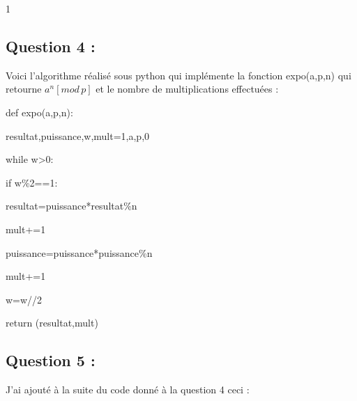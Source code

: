 1\documentclass[a4paper, 11pt,french]{article}
\begin{document}
\subsection*{Question 4 :}

Voici l'algorithme réalisé sous python qui implémente la fonction expo(a,p,n) qui retourne $a^n  [mod \, p]$ et le nombre de multiplications effectuées :

\begin{center}
\begin{minipage}{0.5\linewidth}
\newcommand\esp{\hspace{1cm}}

  def expo(a,p,n):
  
  \esp    resultat,puissance,w,mult=1,a,p,0
  
  \esp    while w>0:
  
  \esp\esp        if w\%2==1:
  
  \esp\esp\esp            resultat=puissance*resultat\%n
  
  \esp\esp\esp            mult+=1
  
  \esp\esp        puissance=puissance*puissance\%n
  
  \esp \esp      mult+=1
  
  \esp  \esp      w=w//2
  
  \esp    return (resultat,mult)
  

    
\end{minipage}
\end{center}

\subsection*{Question 5 : }
J'ai ajouté à la suite du code donné à la question 4  ceci :
\end{document}
